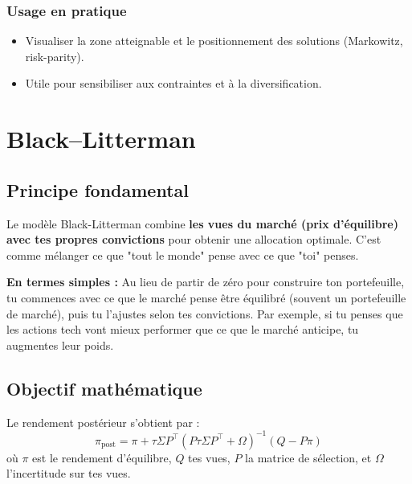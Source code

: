 \documentclass[11pt,a4paper]{article}
\begin{document}
\subsubsection*{Usage en pratique}
\begin{itemize}
  \item Visualiser la zone atteignable et le positionnement des solutions (Markowitz, risk-parity).
  \item Utile pour sensibiliser aux contraintes et à la diversification.
\end{itemize}

\FloatBarrier
\section{Black--Litterman}

\subsection{Principe fondamental}
Le modèle Black-Litterman combine \textbf{les vues du marché (prix d'équilibre) avec tes propres convictions} pour obtenir une allocation optimale. C'est comme mélanger ce que "tout le monde" pense avec ce que "toi" penses.

\textbf{En termes simples :} Au lieu de partir de zéro pour construire ton portefeuille, tu commences avec ce que le marché pense être équilibré (souvent un portefeuille de marché), puis tu l'ajustes selon tes convictions. Par exemple, si tu penses que les actions tech vont mieux performer que ce que le marché anticipe, tu augmentes leur poids.

\subsection{Objectif mathématique}
Le rendement postérieur s'obtient par :
\[\pi_{\text{post}} = \pi + \tau \Sigma P^\top (P \tau \Sigma P^\top + \Omega)^{-1} (Q - P \pi)\]
où \(\pi\) est le rendement d'équilibre, \(Q\) tes vues, \(P\) la matrice de sélection, et \(\Omega\) l'incertitude sur tes vues.
\end{document}
